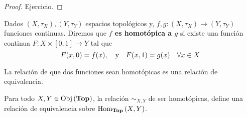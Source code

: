 \documentclass[12pt]{report}
\theoremstyle{largebreak}
\newcommand\cf[3]{\ensuremath{#1:#2\rightarrow#3}}
\newcommand{\Obj}[1]{\ensuremath{\textup{Obj}\left(#1\right)}}
\newcommand{\Hom}[3]{\ensuremath{\textup{Hom}_{#1}\left(#2,#3\right)}}
\newcommand{\Cat}[1]{\ensuremath{\textup{\textbf{#1}}}}
\begin{document}
    \begin{proof}
        Ejercicio.
    \end{proof}

    \begin{mydef}
        Dados $(X,\tau_X),(Y,\tau_Y)$ espacios topológicos y, $\cf{f,g}{(X,\tau_X)}{(Y,\tau_Y)}$ funciones continuas. Diremos que \textbf{$f$ es homotópica a $g$} si existe una función continua $\cf{F}{X\times[0,1]}{Y}$ tal que
        \begin{equation*}
            F(x,0)=f(x),\quad\textup{y}\quad F(x,1)=g(x)\quad\forall x\in X
        \end{equation*}
    \end{mydef}

    \begin{obs}
        La relación de que dos funciones sean homotópicas es una relación de equivalencia.
    \end{obs}

    \begin{propo}
        Para todo $X,Y\in\Obj{\Cat{Top}}$, la relación $\sim_{X,Y}$ de ser homotópicas, define una relación de equivalencia sobre $\Hom{\Cat{Top}}{X}{Y}$.
    \end{propo}
\end{document}
